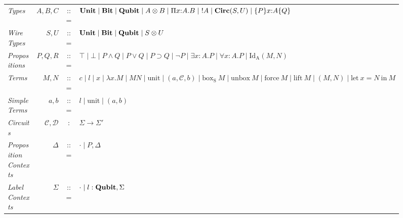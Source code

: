 \documentclass[acmsmall,nonacm,timestamp]{acmart}
\newcommand{\type}[1]{\textrm{\textbf{#1}}}
\begin{document}
\begin{figure}[t]
	\begin{tabular}{lrcl}
		\textit{Types} & $A, B, C$ & ::= & \begin{minipage}[t]{0.5\columnwidth}%
			$ \type{Unit} \mid \type{Bit} \mid \type{Qubit} \mid A \otimes B \mid \Pi x{ : }A.B \mid ~!A  \mid \type{Circ}(S, U) \mid \{P\} x{ : }A \{Q\}$
					\end{minipage}\\
		\textit{Wire Types} & $S, U$ & ::= & $ \type{Unit} \mid \type{Bit} \mid \type{Qubit} \mid S \otimes U$ \\
		\textit{Propositions} & $P, Q, R$ & ::= & \begin{minipage}[t]{0.5\columnwidth}%
			$ \top \mid \bot \mid P \wedge Q \mid P \vee Q \mid P \supset Q \mid \neg P \mid \exists x{:}A.P \mid \forall x{:}A.P \mid \mathrm{Id_A}(M, N)$
		\end{minipage}\\
		\textit{Terms} & $M, N$ & ::= & \begin{minipage}[t]{0.5\columnwidth}%
			$ c \mid l \mid x \mid \lambda x.M \mid MN \mid \mathrm{unit} \mid (a, \mathcal{C}, b) \mid \mathrm{box_S}~M \mid \mathrm{unbox}~M \mid \mathrm{force}~M \mid \mathrm{lift}~M \mid (M, N) \mid \mathrm{let}~ x = N ~\mathrm{in}~ M $
		\end{minipage}\\
		\textit{Simple Terms} & $a, b$ & ::= & $ l \mid \mathrm{unit} \mid (a, b)$ \\
		\textit{Circuits} & $\mathcal{C}, \mathcal{D}$ & : & $ \Sigma \to \Sigma' $ \\
		\textit{Proposition Contexts} & $\Delta$ & ::= & $ \cdot \mid P, \Delta$ \\
		\textit{Label Contexts} & $\Sigma$ & ::= & $ \cdot \mid l : \type{Qubit}, \Sigma$ \\

\end{tabular}
\end{figure}
\end{document}
